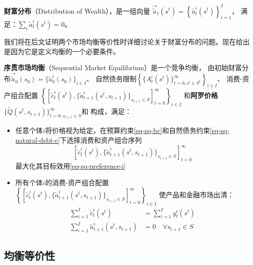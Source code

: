\begin{definition}
    \textbf{财富分布}（Distribution of Wealth），是一组向量
        $\vec{\tilde{a}}_t\left(s^t\right)=\left\{\tilde{a}_t^i\left(s^t\right)\right\}_{i=1}^I$，
        满足：$\sum_{i}\tilde{a}_t^i\left(s^t\right)=0$。
\end{definition}

我们将在后文证明两个市场均衡等价性时详细讨论关于财富分布的问题。现在给出是因为它是定义均衡的一个必要条件。

\begin{definition}
    \textbf{序贯市场均衡}（Sequential Market Equilibrium）是一个竞争均衡，
    由初始财富分布$\vec{\tilde{a}}_0\left(s_0\right)=\{\tilde{a}_0^i\left(s_0\right)\}_{i\in I}$、
    自然债务限制$\left\{ \{ A_t^i\left(s^t\right) \}_{t=0,s^t\in S^t}^{\infty} \right\}_{i\in I}$、
    消费-资产组合配置
    $
    \left\{ \left[\tilde{c}_t^i\left(s^t\right), 
        \{\tilde{a}_{t+1}^i\left(s^t,s_{t+1}\right)\}_{s_{t+1}\in S} \right]_{t=0}^{\infty} \right\}_{i\in I}
    $
    和\textbf{阿罗价格}$\{\tilde{Q}\left(s^t,s_{t+1}\right)\}_{t=0, s_{t+1}\in S}^{\infty}$和
    构成，满足：
    \begin{itemize}
        \item 任意个体$i$将价格视为给定，在预算约束\ref{eq-sq-bc}和自然债务约束\ref{eq-sq-natural-debt-c}下选择消费和资产组合序列
            $$\left[\tilde{c}_t^i\left(s^t\right), \{\tilde{a}_{t+1}^i\left(s^t,s_{t+1}\right)\}_{s_{t+1}\in S} \right]_{t=0}^{\infty}$$
            最大化其目标效用\ref{eq-sq-preference-i}
        \item 所有个体$i$的消费-资产组合配置
            $
            \left\{ \left[\tilde{c}_t^i\left(s^t\right), 
                \{\tilde{a}_{t+1}^i\left(s^t,s_{t+1}\right)\}_{s_{t+1}\in S} \right]_{t=0}^{\infty} \right\}_{i\in I}
            $
            使产品和金融市场出清：
            \begin{align*}
                \sum_{i=1}^I \tilde{c}_t^i\left(s^t\right)&=\sum_{i=1}^I y_t^i\left(s^t\right) \\
                \sum_{i=1}^I \tilde{a}_{t+1}^i\left(s^t, s_{t+1}\right)&=0 \quad \forall s_{t+1} \in S
            \end{align*}
    \end{itemize}
\end{definition}


\subsection{均衡等价性}

